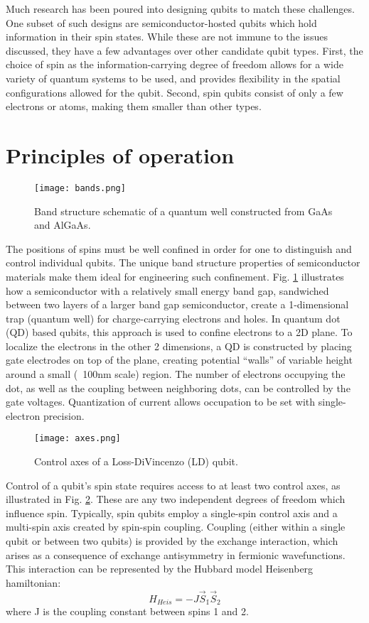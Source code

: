 \documentclass[aps,prl,twocolumn,superscriptaddress,groupedaddress]{revtex4}
\begin{document}
Much research has been poured into designing qubits to match these challenges. One subset of such designs are semiconductor-hosted qubits which hold information in their spin states. While these are not immune to the issues discussed, they have a few advantages over other candidate qubit types. First, the choice of spin as the information-carrying degree of freedom allows for a wide variety of quantum systems to be used, and provides flexibility in the spatial configurations allowed for the qubit. Second, spin qubits consist of only a few electrons or atoms, making them smaller than other types.

\section{Principles of operation}

\begin{figure}
\label{bands}
\texttt{[image: bands.png]}
\caption{\label{bands}Band structure schematic of a quantum well constructed from GaAs and AlGaAs\cite{bands}.}
\end{figure}

The positions of spins must be well confined in order for one to distinguish and control individual qubits. The unique band structure properties of semiconductor materials make them ideal for engineering such confinement. Fig. \ref{bands} illustrates how a semiconductor with a relatively small energy band gap, sandwiched between two layers of a larger band gap semiconductor, create a 1-dimensional trap (quantum well) for charge-carrying electrons and holes. In quantum dot (QD) based qubits, this approach is used to confine electrons to a 2D plane. To localize the electrons in the other 2 dimensions, a QD is constructed by placing gate electrodes on top of the plane, creating potential “walls” of variable height around a small (~100nm scale) region. The number of electrons occupying the dot, as well as the coupling between neighboring dots, can be controlled by the gate voltages. Quantization of current \cite{marder_condensed_2010} allows occupation to be set with single-electron precision.

\begin{figure}
\label{axes}
\texttt{[image: axes.png]}
\caption{\label{axes}Control axes of a Loss-DiVincenzo (LD) qubit\cite{burkard_semiconductor_2021}.}
\end{figure}

Control of a qubit’s spin state requires access to at least two control axes, as illustrated in Fig. \ref{axes}. These are any two independent degrees of freedom which influence spin. Typically, spin qubits employ a single-spin control axis and a multi-spin axis created by spin-spin coupling. Coupling (either within a single qubit or between two qubits) is provided by the exchange interaction, which arises as a consequence of exchange antisymmetry in fermionic wavefunctions. This interaction can be represented by the Hubbard model Heisenberg hamiltonian:
\begin{equation}
H_{Heis} = -J \vec S_1 \dot{} \vec S_2
\end{equation}
where J is the coupling constant between spins 1 and 2.
\end{document}
